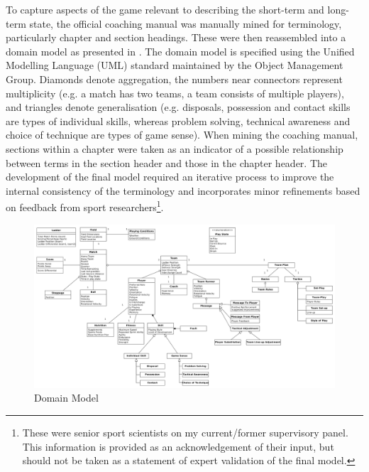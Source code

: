
To capture aspects of the game relevant to describing the short-term and long-term state, the official \afl{} coaching manual \cite{afl2015coach} was manually mined for terminology, particularly chapter and section headings. These were then reassembled into a domain model as presented in . The domain model is specified using the Unified Modelling Language (UML) standard maintained by the Object Management Group. Diamonds denote aggregation, the numbers near connectors represent multiplicity (e.g. a match has two teams, a team consists of multiple players), and triangles denote generalisation (e.g. disposals, possession and contact skills are types of individual skills, whereas problem solving, technical awareness and choice of technique are types of game sense). When mining the coaching manual, sections within a chapter were taken as an indicator of a possible relationship between terms in the section header and those in the chapter header. The development of the final model required an iterative process to improve the internal consistency of the terminology and incorporates minor refinements based on feedback from sport researchers\footnote{These were senior sport scientists on my current/former supervisory panel. This information is provided as an acknowledgement of their input, but should not be taken as a statement of expert validation of the final model.}.

\begin{landscape}

\begin{figure}[htbp]
\centering
\includegraphics[width=\linewidth]{figs/model/afl_model_v3.png}
\caption{\afl{} Domain Model \label{fig:aflmodel}}
\end{figure}

\end{landscape}

